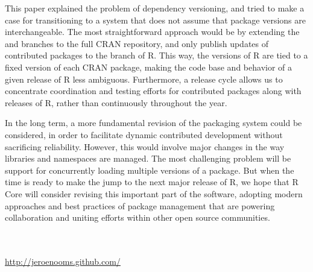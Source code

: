 This paper explained the problem of dependency versioning, and tried to make
a case for transitioning to a system that does not assume that package versions
are interchangeable. The most straightforward approach would be by extending
the  and  branches to the full CRAN repository, and
only publish updates of contributed packages to the 
branch of R. This way, the  versions of R are tied to a fixed
version of each CRAN package, making the code base and behavior of a
given release of R less ambiguous. Furthermore, a release cycle allows us
to concentrate coordination and testing efforts for contributed packages along
with releases of R, rather than continuously throughout the year.

In the long term, a more fundamental revision of the packaging system could be
considered, in order to facilitate dynamic contributed development without
sacrificing reliability. However, this would involve major changes in the way
libraries and namespaces are managed. The most challenging problem will be
support for concurrently loading multiple versions of a package. 
But when the time is ready to make the jump to the next major release of R, we
hope that R Core will consider revising this important part of the software,
adopting modern approaches and best practices of package management that are
powering collaboration and uniting efforts within other open source communities.



\address{Jeroen Ooms\\
  Department of Statistics\\
  University of California\\
  Los Angeles}\\
 \\
\url{http://jeroenooms.github.com/}

